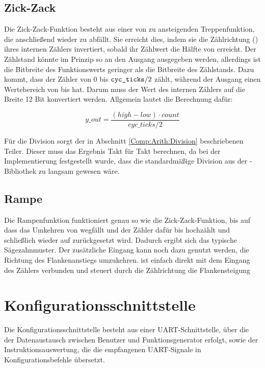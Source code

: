 \subsection{Zick-Zack}  \label{Comp:Func:ZigZag}
Die Zick-Zack-Funktion besteht aus einer von  zu  ansteigenden Treppenfunktion, die anschließend wieder zu  abfällt.
Sie erreicht dies, indem sie die Zählrichtung () ihres internen Zählers invertiert, sobald ihr Zählwert  die Hälfte von  erreicht.
Der Zählstand könnte im Prinzip so an den Ausgang ausgegeben werden, allerdings ist die Bitbreite des Funktionswerts geringer als die Bitbreite des Zählstands.
Dazu kommt, dass der Zähler von 0 bis $\texttt{cyc\_ticks} / 2$ zählt, während der Ausgang einen Wertebereich von  bis  hat.
Darum muss der Wert des internen Zählers auf die Breite 12 Bit konvertiert werden. Allgemein lautet die Berechnung dafür:

$$ y\_out = \frac{(high - low) \cdot count}{cyc\_ticks / 2} $$

Für die Division sorgt der in Abschnitt \cref{Comp:Arith:Division} beschriebenen Teiler.
Dieser  muss das Ergebnis Takt für Takt berechnen, da bei der Implementierung festgestellt wurde, dass die standardmäßige Division aus der -Bibliothek zu langsam gewesen wäre.


\subsection{Rampe} \label{Comp:Func:Ramp}
Die Rampenfunktion funktioniert genau so wie die Zick-Zack-Funktion, bis auf  dass das Umkehren von  wegfällt und der Zähler dafür bis  hochzählt und schließlich wieder auf  zurückgesetzt wird.
Dadurch ergibt sich das typische Sägezahnmuster.
Der zusätzliche Eingang  kann noch dazu genutzt werden, die Richtung des Flankenanstiegs umzukehren.
 ist einfach direkt mit dem Eingang  des Zählers verbunden und steuert durch die Zählrichtung die Flankensteigung

\section{Konfigurationsschnittstelle} \label{Comp:Conf}
Die Konfigurationsschnittstelle  besteht aus einer
UART-Schnittstelle, über die der Datenaustausch zwischen Benutzer und
Funktionsgenerator erfolgt, sowie der Instruktionsauswertung, die die
empfangenen UART-Signale in Konfigurationsbefehle übersetzt.
